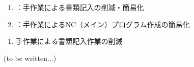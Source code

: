\begin{enumerate}[label=\sarrow]
\item {}：手作業による書類記入の削減・簡易化
\item {}：手作業によるNC（メイン）プログラム作成の簡易化
\end{enumerate}
\begin{enumerate}[label=\sarrow]
\item 手作業による書類記入作業の削減
\end{enumerate}
(to be written...)



\begin{appendices}
\end{appendices}

